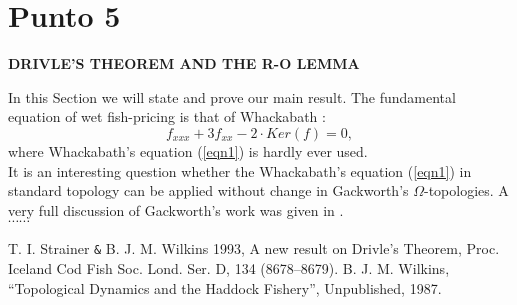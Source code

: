 \documentclass[10pt,onecolumn,letterpaper]{article}
\begin{document}
\section{Punto 5}
\begin{center}
{\small \textbf{DRIVLE’S THEOREM AND THE R-O LEMMA}}
\end{center}
In this Section we will state and prove our main result. The fundamental equation of wet fish-pricing is that of
Whackabath \cite{ref1}:
\begin{equation}\label{eqn1}
f_{xxx}+3f_{xx}-2\cdot Ker(f)=0,
\end{equation}
where Whackabath’s equation (\ref{eqn1}) is hardly ever used.\\
It is an interesting question whether the Whackabath’s equation (\ref{eqn1}) in standard topology can be applied without
change in Gackworth’s $\Omega$-topologies. A very full discussion of Gackworth’s work was given in \cite{ref1,ref2}.\\
$\cdots \cdots$
\renewcommand{\refname}{\centering \rule[0 mm]{30 mm} {0.1 mm}}
\begin{thebibliography}{99} %
 T. I. Strainer \verb+&+ B. J. M. Wilkins 1993, A new result on Drivle’s Theorem, Proc. Iceland Cod Fish Soc. Lond. Ser. D, 134 (8678–8679).
 B. J. M. Wilkins, “Topological Dynamics and the Haddock Fishery”, Unpublished, 1987.
\end{thebibliography}
\end{document}

